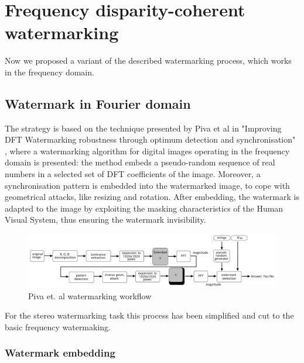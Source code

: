 \chapter{Frequency disparity-coherent watermarking}
\label{dft}

Now we proposed a variant of the described watermarking process, which works in the frequency domain.

\section{Watermark in Fourier domain}

The strategy is based on the technique presented by Piva et al in "Improving DFT Watermarking robustness through optimum detection and synchronisation" \cite{PIVA}, where a watermarking algorithm for digital images operating in the frequency domain is presented: the method embeds a pseudo-random sequence of real numbers in a selected set of DFT coefficients of the image. Moreover, a synchronisation pattern is embedded into the watermarked image, to cope with geometrical attacks, like resizing and rotation. After embedding, the watermark is adapted to the image by exploiting the masking characteristics of the Human Visual System, thus ensuring the watermark invisibility.\newline
\begin{figure}[h!]
\centering
\includegraphics[width=1\textwidth]{./img/blocchi.png}
\caption{\small{Piva et. al watermarking workflow}}
\label{fig:blocchi}
\end{figure}

For the stereo watermarking task this process has been simplified and cut to the basic frequency watermaking.

\subsection{Watermark embedding}

